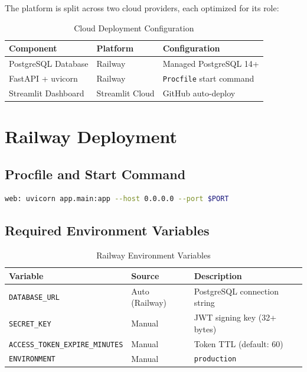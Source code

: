 \documentclass[12pt, a4paper]{report}
\begin{document}
The platform is split across two cloud providers, each optimized for its role:

\begin{table}[H]
\centering
\caption{Cloud Deployment Configuration}
\label{tab:deployment}
\begin{tabular}{@{}lll@{}}
\toprule
\textbf{Component} & \textbf{Platform} & \textbf{Configuration} \\
\midrule
PostgreSQL Database & Railway & Managed PostgreSQL 14+ \\
FastAPI + uvicorn   & Railway & \texttt{Procfile} start command \\
Streamlit Dashboard & Streamlit Cloud & GitHub auto-deploy \\
\bottomrule
\end{tabular}
\end{table}

\section{Railway Deployment}

\subsection{Procfile and Start Command}

\begin{lstlisting}[language=bash, caption={Procfile — Railway Start Command}]
web: uvicorn app.main:app --host 0.0.0.0 --port $PORT
\end{lstlisting}

\subsection{Required Environment Variables}

\begin{table}[H]
\centering
\caption{Railway Environment Variables}
\label{tab:env_vars}
\begin{tabular}{@{}llp{5cm}@{}}
\toprule
\textbf{Variable} & \textbf{Source} & \textbf{Description} \\
\midrule
\texttt{DATABASE\_URL}               & Auto (Railway) & PostgreSQL connection string \\
\texttt{SECRET\_KEY}                 & Manual         & JWT signing key (32+ bytes) \\
\texttt{ACCESS\_TOKEN\_EXPIRE\_MINUTES} & Manual      & Token TTL (default: 60) \\
\texttt{ENVIRONMENT}                 & Manual         & \texttt{production} \\
\bottomrule
\end{tabular}
\end{table}
\end{document}

